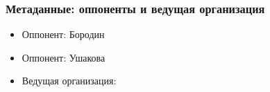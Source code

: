 \begin{frame}\frametitle{Метаданные: оппоненты и ведущая организация}
	\begin{itemize}
		\item
			Оппонент: Бородин
		\item
			Оппонент: Ушакова
		\item
			Ведущая организация:

	\end{itemize}
\end{frame}
